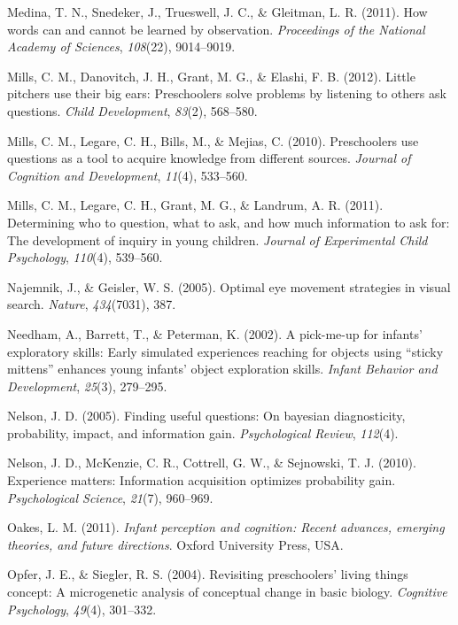 \documentclass[oneside]{report}
\begin{document}
\hypertarget{ref-medina2011words}{}
Medina, T. N., Snedeker, J., Trueswell, J. C., \& Gleitman, L. R.
(2011). How words can and cannot be learned by observation.
\emph{Proceedings of the National Academy of Sciences}, \emph{108}(22),
9014--9019.

\hypertarget{ref-mills2012little}{}
Mills, C. M., Danovitch, J. H., Grant, M. G., \& Elashi, F. B. (2012).
Little pitchers use their big ears: Preschoolers solve problems by
listening to others ask questions. \emph{Child Development},
\emph{83}(2), 568--580.

\hypertarget{ref-mills2010preschoolers}{}
Mills, C. M., Legare, C. H., Bills, M., \& Mejias, C. (2010).
Preschoolers use questions as a tool to acquire knowledge from different
sources. \emph{Journal of Cognition and Development}, \emph{11}(4),
533--560.

\hypertarget{ref-mills2011determining}{}
Mills, C. M., Legare, C. H., Grant, M. G., \& Landrum, A. R. (2011).
Determining who to question, what to ask, and how much information to
ask for: The development of inquiry in young children. \emph{Journal of
Experimental Child Psychology}, \emph{110}(4), 539--560.

\hypertarget{ref-najemnik2005optimal}{}
Najemnik, J., \& Geisler, W. S. (2005). Optimal eye movement strategies
in visual search. \emph{Nature}, \emph{434}(7031), 387.

\hypertarget{ref-needham2002pick}{}
Needham, A., Barrett, T., \& Peterman, K. (2002). A pick-me-up for
infants' exploratory skills: Early simulated experiences reaching for
objects using ``sticky mittens'' enhances young infants' object
exploration skills. \emph{Infant Behavior and Development},
\emph{25}(3), 279--295.

\hypertarget{ref-nelson2005finding}{}
Nelson, J. D. (2005). Finding useful questions: On bayesian
diagnosticity, probability, impact, and information gain.
\emph{Psychological Review}, \emph{112}(4).

\hypertarget{ref-nelson2010experience}{}
Nelson, J. D., McKenzie, C. R., Cottrell, G. W., \& Sejnowski, T. J.
(2010). Experience matters: Information acquisition optimizes
probability gain. \emph{Psychological Science}, \emph{21}(7), 960--969.

\hypertarget{ref-oakes2011infant}{}
Oakes, L. M. (2011). \emph{Infant perception and cognition: Recent
advances, emerging theories, and future directions}. Oxford University
Press, USA.

\hypertarget{ref-opfer2004revisiting}{}
Opfer, J. E., \& Siegler, R. S. (2004). Revisiting preschoolers' living
things concept: A microgenetic analysis of conceptual change in basic
biology. \emph{Cognitive Psychology}, \emph{49}(4), 301--332.
\end{document}
